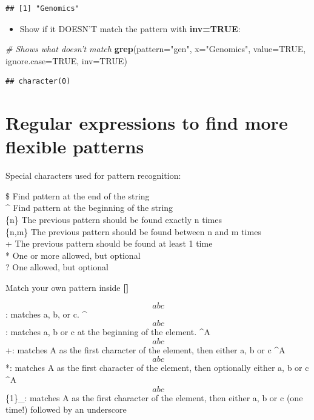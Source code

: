 \documentclass[]{book}
\newenvironment{Shaded}{\begin{snugshade}}{\end{snugshade}}
\newcommand{\CommentTok}[1]{\textcolor[rgb]{0.56,0.35,0.01}{\textit{#1}}}
\newcommand{\DataTypeTok}[1]{\textcolor[rgb]{0.13,0.29,0.53}{#1}}
\newcommand{\KeywordTok}[1]{\textcolor[rgb]{0.13,0.29,0.53}{\textbf{#1}}}
\newcommand{\NormalTok}[1]{#1}
\newcommand{\OtherTok}[1]{\textcolor[rgb]{0.56,0.35,0.01}{#1}}
\newcommand{\StringTok}[1]{\textcolor[rgb]{0.31,0.60,0.02}{#1}}
\providecommand{\tightlist}{%
  \setlength{\itemsep}{0pt}\setlength{\parskip}{0pt}}
\begin{document}
\begin{verbatim}
## [1] "Genomics"
\end{verbatim}

\begin{itemize}
\tightlist
\item
  Show if it DOESN'T match the pattern with \textbf{inv=TRUE}:
\end{itemize}

\begin{Shaded}
\begin{Highlighting}[]
\CommentTok{# Shows what doesn't match}
\KeywordTok{grep}\NormalTok{(}\DataTypeTok{pattern=}\StringTok{"gen"}\NormalTok{,}
        \DataTypeTok{x=}\StringTok{"Genomics"}\NormalTok{,}
        \DataTypeTok{value=}\OtherTok{TRUE}\NormalTok{,}
        \DataTypeTok{ignore.case=}\OtherTok{TRUE}\NormalTok{,}
    \DataTypeTok{inv=}\OtherTok{TRUE}\NormalTok{)}
\end{Highlighting}
\end{Shaded}

\begin{verbatim}
## character(0)
\end{verbatim}

\hypertarget{regular-expressions-to-find-more-flexible-patterns}{%
\section{Regular expressions to find more flexible patterns}\label{regular-expressions-to-find-more-flexible-patterns}}

Special characters used for pattern recognition:

\$ \textbar{} Find pattern at the end of the string \textbar{}\\
\^{} \textbar{} Find pattern at the beginning of the string \textbar{}\\
\{n\} \textbar{} The previous pattern should be found exactly n times \textbar{}\\
\{n,m\} \textbar{} The previous pattern should be found between n and m times\textbar{}\\
+ \textbar{} The previous pattern should be found at least 1 time \textbar{}\\
* \textbar{} One or more allowed, but optional \textbar{}\\
? \textbar{} One allowed, but optional \textbar{}

Match your own pattern inside \textbf{{[}{]}}

\[abc\]: matches a, b, or c.
\^{}\[abc\]: matches a, b or c at the beginning of the element.
\^{}A\[abc\]+: matches A as the first character of the element, then either a, b or c
\^{}A\[abc\]*: matches A as the first character of the element, then optionally either a, b or c
\^{}A\[abc\]\{1\}\_: matches A as the first character of the element, then either a, b or c (one time!) followed by an underscore
\end{document}
